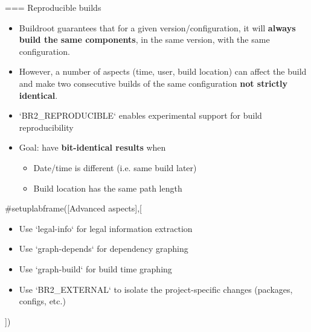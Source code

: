 === {Reproducible builds}
  \begin{itemize}
  \item Buildroot guarantees that for a given version/configuration,
    it will {\bf always build the same components}, in the same
    version, with the same configuration.
  \item However, a number of aspects (time, user, build location) can
    affect the build and make two consecutive builds of the same
    configuration {\bf not strictly identical}.
  \item `BR2_REPRODUCIBLE` enables experimental support for build
    reproducibility
  \item Goal: have {\bf bit-identical results} when
    \begin{itemize}
    \item Date/time is different (i.e. same build later)
    \item Build location has the same path length
    \end{itemize}
  \end{itemize}


#setuplabframe([Advanced aspects],[
  \begin{itemize}
  \item Use `legal-info` for legal information extraction
  \item Use `graph-depends` for dependency graphing
  \item Use `graph-build` for build time graphing
  \item Use `BR2_EXTERNAL` to isolate the project-specific
    changes (packages, configs, etc.)
  \end{itemize}
])